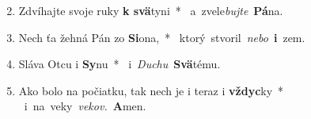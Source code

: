 \begin{flushleft}
\begin{enumerate}[leftmargin=*]
\setcounter{enumi}{1}
\item Zdvíhajte svoje ruky \textbf{k svä}tyni~* \mbox{ a zvele{\it bujte} \textbf{Pá}na.}
\item Nech ťa žehná Pán zo \textbf{Si}ona,~* \mbox{ ktorý stvoril {\it nebo} \textbf{i} zem.}
\item Sláva Otcu i \textbf{Sy}nu~* \mbox{ i {\it Duchu} \textbf{Svä}tému.}
\item Ako bolo na počiatku, tak nech je i teraz i \textbf{vždyc}ky~* \mbox{ i na veky {\it vekov.} \textbf{A}men.}\end{enumerate}
\end{flushleft}


